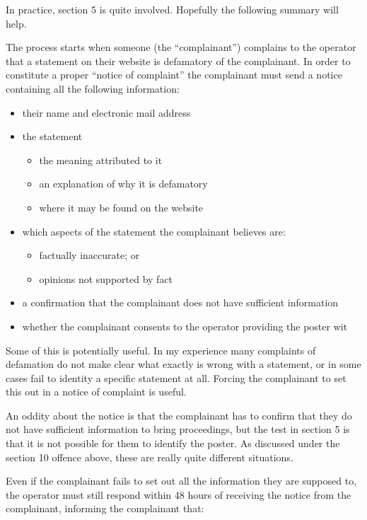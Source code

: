 \documentclass[]{article}
\begin{document}
In practice, section 5 is quite involved. Hopefully the following summary will help.

The process starts when someone (the ``complainant'') complains to the operator that a statement on their website is defamatory of the complainant. In order to constitute a proper ``notice of complaint'' the complainant must send a notice containing all the following information:

\begin{itemize}
\item their name and electronic mail address
\item the statement
  \begin{itemize}
  \item the meaning attributed to it
  \item an explanation of why it is defamatory
  \item where it may be found on the website
  \end{itemize}
\item which aspects of the statement the complainant believes are:
  \begin{itemize}
  \item factually inaccurate; or
  \item opinions not supported by fact
  \end{itemize}
\item a confirmation that the complainant does not have sufficient information
\item whether the complainant consents to the operator providing the poster wit
\end{itemize}

Some of this is potentially useful. In my experience many complaints of defamation do not make clear what exactly is wrong with a statement, or in some cases fail to identity a specific statement at all. Forcing the complainant to set this out in a notice of complaint is useful.

An oddity about the notice is that the complainant has to confirm that they do not have sufficient information to bring proceedings, but the test in section 5 is that it is not possible for them to identify the poster. As discussed under the section 10 offence above, these are really quite different situations.

Even if the complainant fails to set out all the information they are supposed to, the operator must still respond within 48 hours of receiving the notice from the complainant, informing the complainant that:
\end{document}
